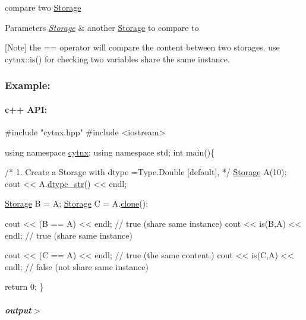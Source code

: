 compare two \hyperlink{classcytnx_1_1Storage}{Storage} 


\begin{DoxyParams}{Parameters}
{\em \hyperlink{classcytnx_1_1Storage}{Storage}} & another \hyperlink{classcytnx_1_1Storage}{Storage} to compare to\\
\hline
\end{DoxyParams}
\mbox{[}Note\mbox{]} the == operator will compare the content between two storages. use cytnx\+::is() for checking two variables share the same instance.

\subsubsection*{Example\+:}

\paragraph*{c++ A\+PI\+:}


\begin{DoxyCodeInclude}
\textcolor{preprocessor}{#include "cytnx.hpp"}
\textcolor{preprocessor}{#include <iostream>}


\textcolor{keyword}{using namespace }\hyperlink{namespacecytnx}{cytnx};
\textcolor{keyword}{using namespace }std;
\textcolor{keywordtype}{int} main()\{ 

    \textcolor{comment}{/*}
\textcolor{comment}{        1. Create a Storage with }
\textcolor{comment}{        dtype =Type.Double [default],}
\textcolor{comment}{    */}
    \hyperlink{classcytnx_1_1Storage}{Storage} A(10);
    cout << A.\hyperlink{classcytnx_1_1Tensor_a9e09106c7529e8be90caa52e1541e498}{dtype\_str}() << endl;

    \hyperlink{classcytnx_1_1Storage}{Storage} B = A;  
    \hyperlink{classcytnx_1_1Storage}{Storage} C = A.\hyperlink{classcytnx_1_1Tensor_a5e2248e9babdb786167ed349df9084ae}{clone}();

    cout << (B == A) << endl; \textcolor{comment}{// true (share same instance)}
    cout << is(B,A) << endl; \textcolor{comment}{// true (share same instance)}
  
    cout << (C == A) << endl;  \textcolor{comment}{// true (the same content.)}
    cout << is(C,A) << endl; \textcolor{comment}{// false (not share same instance)}
 

    \textcolor{keywordflow}{return} 0;
\}

\end{DoxyCodeInclude}
 \subparagraph*{output$>$}


